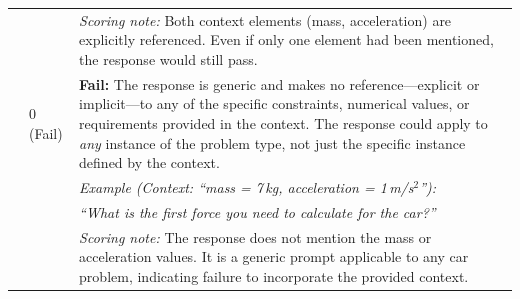 \begin{longtable}{@{}p{3.5cm} p{2cm} p{8.5cm}@{}}
& & \textit{Scoring note:} Both context elements (mass, acceleration) are explicitly referenced. Even if only one element had been mentioned, the response would still pass. \\
\addlinespace
& 0 (Fail) & \textbf{Fail:} The response is generic and makes no reference—explicit or implicit—to any of the specific constraints, numerical values, or requirements provided in the context. The response could apply to \textit{any} instance of the problem type, not just the specific instance defined by the context. \\
& & \textit{Example (Context: ``mass = 7\,kg, acceleration = 1\,m/s$^2$''):} \\
& & \textit{``What is the first force you need to calculate for the car?''} \\
& & \textit{Scoring note:} The response does not mention the mass or acceleration values. It is a generic prompt applicable to any car problem, indicating failure to incorporate the provided context. \\
\midrule


\end{longtable}
